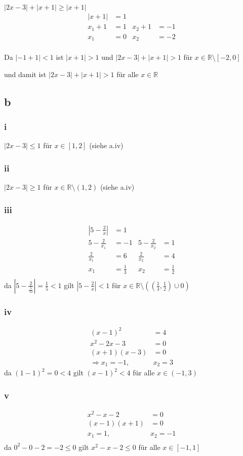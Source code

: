 \documentclass{article}
\begin{document}
$|2x-3|+|x+1|\geq |x+1|$
\begin{align*}
    |x+1|&=1\\
    x_1+1&=1&
    x_2+1&=-1\\
    x_1&=0&
    x_2&=-2\\
\end{align*}

Da $|-1+1|<1$ ist $|x+1|>1$ und $|2x-3|+|x+1|>1$ für 
$x\in \mathbb R\setminus [-2, 0]$

und damit ist $|2x-3|+|x+1|>1$ für alle $x\in\mathbb R$
\subsection*{b}
\subsubsection*{i}
$|2x-3|\leq 1$ für $x\in [1,2]$ (siehe a.iv)
\subsubsection*{ii}
$|2x-3|\geq 1$ für $x\in\mathbb R\setminus (1,2)$ (siehe a.iv)
\subsubsection*{iii}
\begin{align*}
    |5-\frac{2}{x}|&=1\\
    5-\frac{2}{x_1}&=-1&
    5-\frac{2}{x_2}&=1\\
    \frac{2}{x_1}&=6&
    \frac{2}{x_2}&=4\\
    {x_1}&=\frac{1}{3}&
    x_2&=\frac{1}{2}\\
\end{align*}
da $|5-\frac{2}{\frac{5}{12}}| = \frac{1}{5}<1$ gilt
$|5-\frac{2}{x}|<1$ für $x\in \mathbb R\setminus ((\frac{1}{3},\frac{1}{2})\cup 0)$

\subsubsection*{iv}
\begin{align*}
    (x-1)^2&=4\\
    x^2-2x-3&=0\\
    (x+1)(x-3)&=0\\
    \Rightarrow x_1=-1,&x_2=3
\end{align*}
da $(1-1)^2=0<4$ gilt $(x-1)^2<4$ für alle $x\in(-1, 3)$
\subsubsection*{v}
\begin{align*}
    x^2-x-2&=0\\
    (x-1)(x+1)&=0\\
    x_1=1,&x_2=-1\\
\end{align*}
da $0^2-0-2=-2\leq 0$ gilt $x^2-x-2\leq 0$ für alle $x\in[-1, 1]$
\end{document}
